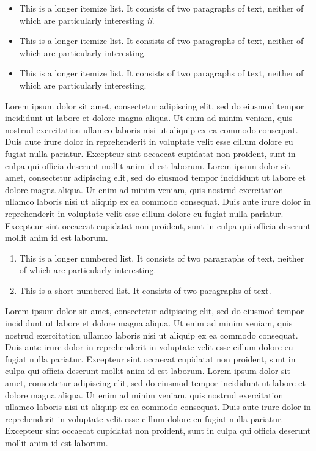 \documentclass{sbc2025}%
\begin{document}
\begin{itemize}
\item This is a longer itemize list. It consists of two paragraphs of text, neither of which are particularly interesting {\it ii}.
\item This is a longer itemize list. It consists of two paragraphs of text, neither of which are particularly interesting.
\item This is a longer itemize list. It consists of two paragraphs of text, neither of which are particularly interesting.
\end{itemize}

Lorem ipsum dolor sit amet, consectetur adipiscing elit, sed do eiusmod tempor incididunt ut labore et dolore magna aliqua. Ut enim ad minim veniam, quis nostrud exercitation ullamco laboris nisi ut aliquip ex ea commodo consequat. Duis aute irure dolor in reprehenderit in voluptate velit esse cillum dolore eu fugiat nulla pariatur. Excepteur sint occaecat cupidatat non proident, sunt in culpa qui officia deserunt mollit anim id est laborum. Lorem ipsum dolor sit amet, consectetur adipiscing elit, sed do eiusmod tempor incididunt ut labore et dolore magna aliqua. Ut enim ad minim veniam, quis nostrud exercitation ullamco laboris nisi ut aliquip ex ea commodo consequat. Duis aute irure dolor in reprehenderit in voluptate velit esse cillum dolore eu fugiat nulla pariatur. Excepteur sint occaecat cupidatat non proident, sunt in culpa qui officia deserunt mollit anim id est laborum.

\begin{enumerate}%
\item This is a longer numbered list. It consists of two paragraphs of text, neither of which are particularly interesting.
\item This is a short numbered list. It consists of two paragraphs of text.
\end{enumerate}

Lorem ipsum dolor sit amet, consectetur adipiscing elit, sed do eiusmod tempor incididunt ut labore et dolore magna aliqua. Ut enim ad minim veniam, quis nostrud exercitation ullamco laboris nisi ut aliquip ex ea commodo consequat. Duis aute irure dolor in reprehenderit in voluptate velit esse cillum dolore eu fugiat nulla pariatur. Excepteur sint occaecat cupidatat non proident, sunt in culpa qui officia deserunt mollit anim id est laborum. Lorem ipsum dolor sit amet, consectetur adipiscing elit, sed do eiusmod tempor incididunt ut labore et dolore magna aliqua. Ut enim ad minim veniam, quis nostrud exercitation ullamco laboris nisi ut aliquip ex ea commodo consequat. Duis aute irure dolor in reprehenderit in voluptate velit esse cillum dolore eu fugiat nulla pariatur. Excepteur sint occaecat cupidatat non proident, sunt in culpa qui officia deserunt mollit anim id est laborum.
\end{document}
